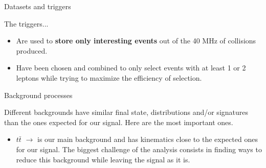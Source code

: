 \documentclass[8 pt]{beamer}
\begin{document}
\begin{frame}{Datasets and triggers}
	\begin{exampleblock}{} The triggers... \end{exampleblock}
	\begin{itemize}
	\justifying
	\item Are used to \textbf{store only interesting events} out of the 40 MHz of collisions produced. \\ \vspace{8pt}
	\item Have been chosen and combined to only select events with at least 1 or 2 leptons while trying to maximize the efficiency of selection.
	\end{itemize} \vfill 
	
\end{frame}


\begin{frame}{Background processes}

	\justifying
	Different backgrounds have similar final state, distributions and/or signatures than the ones expected for our signal. Here are the most important ones. \vfill
	
	\begin{itemize}
	\justifying
	\item $t \bar t$ $\rightarrow$ is our main background and has kinematics close to the expected ones for our signal. The biggest challenge of the analysis consists in finding ways to reduce this background while leaving the signal as it is. \vspace{8pt} 
	

\end{itemize}
\end{frame}
\end{document}
